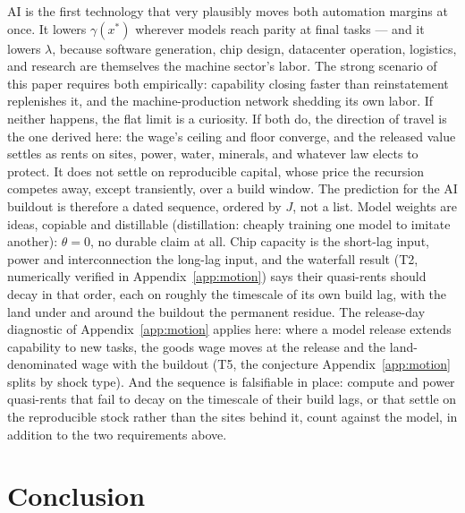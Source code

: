 \documentclass[12pt]{article}
\theoremstyle{plain}
\begin{document}
AI is the first technology that very plausibly moves both automation margins at once. It lowers $\gamma (x^*)$ wherever models reach parity at final tasks --- and it lowers $\lambda$, because software generation, chip design, datacenter operation, logistics, and research are themselves the machine sector's labor. The strong scenario of this paper requires both empirically: capability closing faster than reinstatement replenishes it, and the machine-production network shedding its own labor. If neither happens, the flat limit is a curiosity. If both do, the direction of travel is the one derived here: the wage's ceiling and floor converge, and the released value settles as rents on sites, power, water, minerals, and whatever law elects to protect. It does not settle on reproducible capital, whose price the recursion competes away, except transiently, over a build window. The prediction for the AI buildout is therefore a dated sequence, ordered by $J$, not a list. Model weights are ideas, copiable and distillable (distillation: cheaply training one model to imitate another): $\theta = 0$, no durable claim at all. Chip capacity is the short-lag input, power and interconnection the long-lag input, and the waterfall result (T2, numerically verified in Appendix~\ref{app:motion}) says their quasi-rents should decay in that order, each on roughly the timescale of its own build lag, with the land under and around the buildout the permanent residue. The release-day diagnostic of Appendix~\ref{app:motion} applies here: where a model release extends capability to new tasks, the goods wage moves at the release and the land-denominated wage with the buildout (T5, the conjecture Appendix~\ref{app:motion} splits by shock type). And the sequence is falsifiable in place: compute and power quasi-rents that fail to decay on the timescale of their build lags, or that settle on the reproducible stock rather than the sites behind it, count against the model, in addition to the two requirements above.

\section{Conclusion}\label{sec:conclusion}
\end{document}
